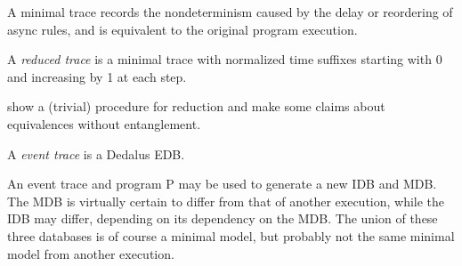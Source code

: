 A minimal trace records the nondeterminism caused by the delay or reordering of async rules, and
is equivalent to the original program execution.  

\begin{definition}
A \emph{reduced trace} is a minimal trace with normalized time suffixes starting with 0 and increasing by 1 at each step.
\end{definition}

show a (trivial) procedure for reduction and make some claims about equivalences without entanglement.

\begin{definition}
A \emph{event trace} is a Dedalus EDB.
\end{definition}

An event trace and program P may be used to generate a new IDB and MDB.  The MDB is virtually certain to differ from that of another
execution, while the IDB may differ, depending on its dependency on the MDB.  The union of these three databases is of course a
minimal model, but probably not the same minimal model from another execution.  



